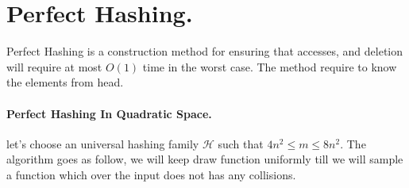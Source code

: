 \newpage{}

\section{Perfect Hashing.}
Perfect Hashing is a construction method for ensuring that accesses, and deletion will require at most \( O(1)\) time in the worst case. The method require to know the elements from head. 
\paragraph{Perfect Hashing In Quadratic Space.} let's choose an universal hashing family \( \mathcal{H}\) such that \(4n^{2} \le m \le 8n^{2}\). The algorithm goes as follow, we will keep draw function uniformly till we will sample a function which over the input does not has any collisions.     

